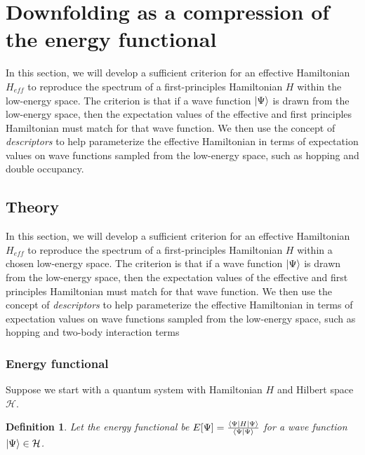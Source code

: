 \newtheorem{theorem}{Theorem}
\newtheorem{definition}{Definition}
\newtheorem{lemma}{Lemma}


\section{Downfolding as a compression of the energy functional}
\label{sec:theory}

In this section, we will develop a sufficient criterion for an effective Hamiltonian $H_{eff}$ to reproduce the spectrum of a first-principles Hamiltonian $H$ within the low-energy space. 
The criterion is that if a wave function $\ket{\Psi}$ is drawn from the low-energy space, then the expectation values of the effective and first principles Hamiltonian must match for that wave function.
We then use the concept of \textit{descriptors} to help parameterize the effective Hamiltonian in terms of expectation values on wave functions sampled from the low-energy space, such as hopping and double occupancy.

\subsection{Theory} 
In this section, we will develop a sufficient criterion for an effective Hamiltonian $H_{eff}$ to reproduce the spectrum of a first-principles Hamiltonian $H$ within a chosen low-energy space. 
The criterion is that if a wave function $\ket{\Psi}$ is drawn from the low-energy space, then the expectation values of the effective and first principles Hamiltonian must match for that wave function.
We then use the concept of \textit{descriptors} to help parameterize the effective Hamiltonian in terms of expectation values on wave functions sampled from the low-energy space, such as hopping and two-body interaction terms
\subsubsection{Energy functional}
Suppose we start with a quantum system with Hamiltonian $H$ and Hilbert space ${\mathcal H}$.

\begin{definition}
Let the energy functional be $E[\Psi] = \frac{\bra{\Psi}H\ket{\Psi}}{\braket{\Psi|\Psi}}$ for a wave function $\ket{\Psi} \in {\mathcal H}$.
\end{definition}


